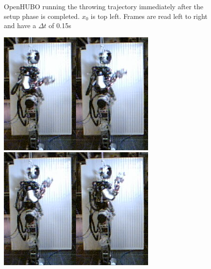 \begin{figure}[ht]
  \caption{OpenHUBO running the throwing trajectory immediately after the setup phase is completed.  $x_0$ is top left.  Frames are read left to right and have a $\Delta t$ of 0.15s\cite{dlofaro-srm}}
  \label{fig:fThrow}
\end{figure}

\begin{figure}[ht]
  \centering
\includegraphics[width=0.25\columnwidth]{./pix/slowMotion/1.png}\includegraphics[width=0.25\columnwidth]{./pix/slowMotion/2.png}\includegraphics[width=0.25\columnwidth]{./pix/slowMotion/3.png}\includegraphics[width=0.25\columnwidth]{./pix/slowMotion/4.png}

\end{figure}
